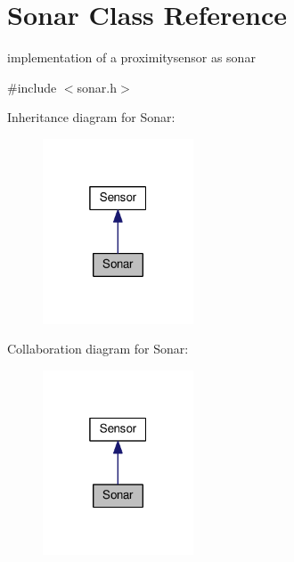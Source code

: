 \hypertarget{classSonar}{}\section{Sonar Class Reference}
\label{classSonar}


implementation of a proximitysensor as sonar  




{\ttfamily \#include $<$sonar.\+h$>$}



Inheritance diagram for Sonar\+:\nopagebreak
\begin{figure}[H]
\begin{center}
\leavevmode
\includegraphics[width=127pt]{classSonar__inherit__graph}
\end{center}
\end{figure}


Collaboration diagram for Sonar\+:\nopagebreak
\begin{figure}[H]
\begin{center}
\leavevmode
\includegraphics[width=127pt]{classSonar__coll__graph}
\end{center}
\end{figure}
